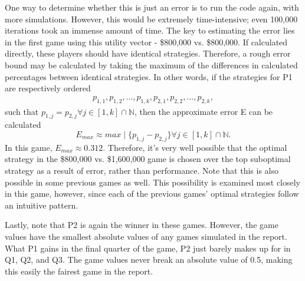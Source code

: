 \documentclass[11pt]{article}
\begin{document}
One way to determine whether this is just an error is to run the code again, with more simulations. However, this would be extremely time-intensive; even 100,000 iterations took an immense amount of time. The key to estimating the error lies in the first game using this utility vector - \$800,000 vs. \$800,000. If calculated directly, these players should have identical strategies. Therefore, a rough error bound may be calculated by taking the maximum of the differences in calculated percentages between identical strategies. In other words, if the strategies for P1 are respectively ordered 
\begin{align*}
p_{1,1}, p_{1,2}, ..., p_{1,k},
p_{2,1}, p_{2,2}, ..., p_{2,k},
\end{align*}
such that $p_{1,j} = p_{2,j} \forall j \in [1,k]\cap \mathbb{N}$, then the approximate error E can be calculated
\begin{equation}
E_{max} \approx max \mid \{p_{1,j} - p_{2,j} \} \forall j \in [1,k]\cap \mathbb{N}.
\end{equation}
In this game, $E_{max} \approx 0.312$. Therefore, it's very well possible that the optimal strategy in the \$800,000 vs. \$1,600,000 game is chosen over the top suboptimal strategy as a result of error, rather than performance. Note that this is also possible in some previous games as well. This possibility is examined most closely in this game, however, since each of the previous games' optimal strategies follow an intuitive pattern.

Lastly, note that P2 is again the winner in these games. However, the game values have the smallest absolute values of any games simulated in the report. What P1 gains in the final quarter of the game, P2 just barely makes up for in Q1, Q2, and Q3. The game values never break an absolute value of 0.5, making this easily the fairest game in the report. 
\end{document}
